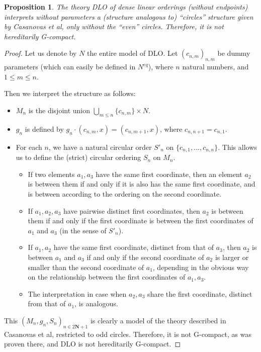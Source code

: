 \documentclass[final,a4paper,12pt]{amsart}
\newcommand{\bN}{{\mathbf{N}}}
\newtheorem{prop}[thm]{Proposition}
\theoremstyle{remark}
\theoremstyle{definition}
\begin{document}
	\begin{prop}
		The theory DLO of dense linear orderings (without endpoints) interprets without parameters a (structure analogous to) ``circles'' structure given by Casanovas et al, only without the ``even'' circles. Therefore, it is not hereditarily G-compact.
	\end{prop}
	\begin{proof}
		Let us denote by $N$ the entire model of DLO. Let $(c_{n,m})_{n,m}$ be dummy parameters (which can easily be defined in $N^{eq}$), where $n$ natural numbers, and $1\leq m\leq n$.
		
		Then we interpret the structure as follows:
		\begin{itemize}
			\item
			$M_n$ is the disjoint union $\bigcup_{m\leq n} \{c_{n,m}\}\times N$.
			\item
			$g_n$ is defined by $g_n\cdot (c_{n,m},x)=(c_{n,m+1},x)$, where $c_{n,n+1}=c_{n,1}$.
			\item
			For each $n$, we have a natural circular order $S'_n$ on $\{c_{n,1},\ldots,c_{n,n}\}$. This allows us to define the (strict) circular ordering $S_n$ on $M_n$.
			\begin{itemize}
				\item
				If two elements $a_1,a_3$ have the same first coordinate, then an element $a_2$ is between them if and only if it is also has the same first coordinate, and is between according to the ordering on the second coordinate. 
				\item
				If $a_1, a_2, a_3$ have pairwise distinct first coordinates, then $a_2$ is between them if and only if the first coordinate is between the first coordinates of $a_1$ and $a_3$ (in the sense of $S'_n$).
				\item
				If $a_1, a_2$ have the same first coordinate, distinct from that of $a_3$, then $a_2$ is between $a_1$ and $a_3$ if and only if the second coordinate of $a_2$ is larger or smaller than the second coordinate of $a_1$, depending in the obvious way on the relationship between the first coordinates of $a_1,a_3$.
				\item
				The interpretation in case when $a_2,a_3$ share the first coordinate, distinct from that of $a_1$, is analogous.
			\end{itemize}
		\end{itemize}
		This $(M_n,g_n,S_n)_{n\in 2{\bN}+1}$ is clearly a model of the theory described in Casanovas et al, restricted to odd circles. Therefore, it is not G-compact, as was proven there, and DLO is not hereditarily G-compact.
	\end{proof}
	
\end{document}
